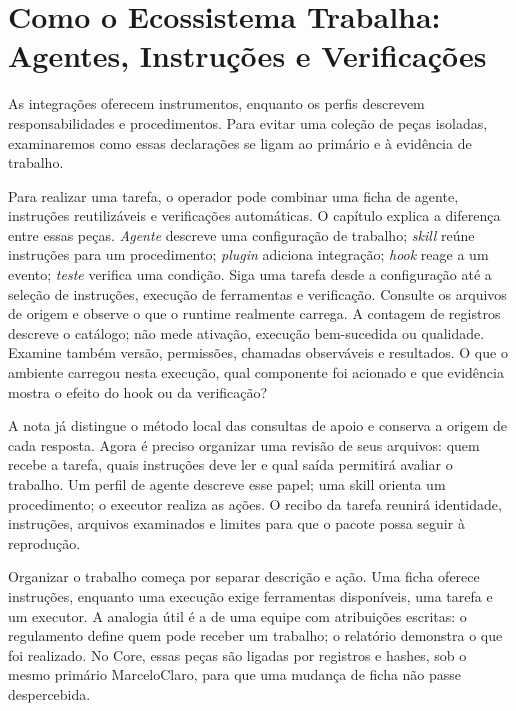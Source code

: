 \chapter{Como o Ecossistema Trabalha: Agentes, Instruções e Verificações}

As integrações oferecem instrumentos, enquanto os perfis descrevem responsabilidades e procedimentos. Para evitar uma coleção de peças isoladas, examinaremos como essas declarações se ligam ao primário e à evidência de trabalho.


\roteirodidatico
{Para realizar uma tarefa, o operador pode combinar uma ficha de agente, instruções reutilizáveis e verificações automáticas. O capítulo explica a diferença entre essas peças.}
{\emph{Agente} descreve uma configuração de trabalho; \emph{skill} reúne instruções para um procedimento; \emph{plugin} adiciona integração; \emph{hook} reage a um evento; \emph{teste} verifica uma condição.}
{Siga uma tarefa desde a configuração até a seleção de instruções, execução de ferramentas e verificação. Consulte os arquivos de origem e observe o que o runtime realmente carrega.}
{A contagem de registros descreve o catálogo; não mede ativação, execução bem-sucedida ou qualidade. Examine também versão, permissões, chamadas observáveis e resultados.}
{O que o ambiente carregou nesta execução, qual componente foi acionado e que evidência mostra o efeito do hook ou da verificação?}

{A nota já distingue o método local das consultas de apoio e conserva a origem de cada resposta. Agora é preciso organizar uma revisão de seus arquivos: quem recebe a tarefa, quais instruções deve ler e qual saída permitirá avaliar o trabalho. Um perfil de agente descreve esse papel; uma skill orienta um procedimento; o executor realiza as ações. O recibo da tarefa reunirá identidade, instruções, arquivos examinados e limites para que o pacote possa seguir à reprodução.}

\begin{descricao}
Organizar o trabalho começa por separar descrição e ação. Uma ficha oferece
instruções, enquanto uma execução exige ferramentas disponíveis, uma tarefa e
um executor. A analogia útil é a de uma equipe com atribuições escritas: o
regulamento define quem pode receber um trabalho; o relatório demonstra o que
foi realizado. No Core, essas peças são ligadas por registros e hashes, sob o
mesmo primário MarceloClaro, para que uma mudança de ficha não passe despercebida.
\end{descricao}

